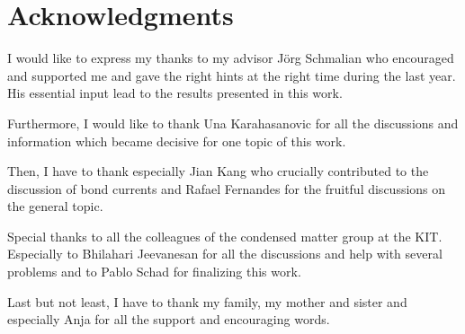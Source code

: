 \chapter*{Acknowledgments}

I would like to express my thanks to my advisor J\"org Schmalian who encouraged and supported me and gave the right hints at the right time during the last year. 
His essential input lead to the results presented in this work. 

Furthermore, I would like to thank Una Karahasanovic for all the discussions and information which became decisive for one topic of this work. 

Then, I have to thank especially Jian Kang who crucially contributed to the discussion of bond currents and Rafael Fernandes for the fruitful discussions on the general topic. 

Special thanks to all the colleagues of the condensed matter group at the KIT. Especially to Bhilahari Jeevanesan for all the discussions and help with several problems and to Pablo Schad for finalizing this work. 

Last but not least, I have to thank my family, my mother and sister and especially Anja for all the support and encouraging words. 
 
